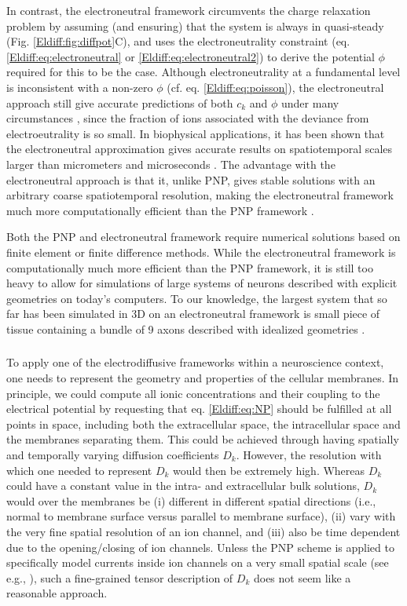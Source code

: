 In contrast, the electroneutral framework circumvents the charge relaxation problem by assuming (and ensuring) that the system is always in quasi-steady (Fig. \ref{Eldiff:fig:diffpot}C), and uses the electroneutrality constraint (eq. \ref{Eldiff:eq:electroneutral} or \ref{Eldiff:eq:electroneutral2}) to derive the potential $\phi$ required for this to be the case. 
Although electroneutrality at a fundamental level is inconsistent with a non-zero $\phi$ (cf. eq. \ref{Eldiff:eq:poisson}), the electroneutral approach still give accurate predictions of both $c_k$ and $\phi$ under many circumstances \citep{Feldberg2000}, since the fraction of ions associated with the deviance from electroeutrality is so small. In biophysical applications, it has been shown that the electroneutral approximation gives accurate results on spatiotemporal scales larger than micrometers and microseconds \citep{Grodzinsky2011, Pods2017, Solbra2018}. The advantage with the electroneutral approach is that it, unlike PNP, gives stable solutions with an arbitrary coarse spatiotemporal resolution, making the electroneutral framework much more computationally efficient than the PNP framework . 

Both the PNP and electroneutral framework require numerical solutions based on finite element or finite difference methods. While the electroneutral framework is computationally much more efficient than the PNP framework, it is still too heavy to allow for simulations of large systems of neurons described with explicit geometries on today's computers. To our knowledge, the largest system that so far has been simulated in 3D on an electroneutral framework is small piece of tissue containing a bundle of 9 axons described with idealized geometries \citep{ellingsrud2020}.


\subsubsection{}
\label{sec:Eldiff:BCs}
To apply one of the electrodiffusive frameworks within a neuroscience context, one needs to represent the geometry and properties of the cellular membranes. In principle, we could compute all ionic concentrations and their coupling to the electrical potential by requesting that eq. \ref{Eldiff:eq:NP} should be fulfilled at all points in space, including both the extracellular space, the intracellular space and the membranes separating them. This could be achieved through having spatially and temporally varying diffusion coefficients $D_k$. However, the resolution with which one needed to represent $D_k$ would then be extremely high. Whereas $D_k$ could have a constant value in the intra- and extracellular bulk solutions, $D_k$ would over the membranes be (i) different in different spatial directions (i.e., normal to membrane surface versus parallel to membrane surface), (ii) vary with the very fine spatial resolution of an ion channel, and (iii) also be time dependent due to the opening/closing of ion channels. Unless the PNP scheme is applied to specifically model currents inside ion channels on a very small spatial scale (see e.g., \citep{Gardner2011, Zheng2011}), such a fine-grained tensor description of $D_k$ does not seem like a reasonable approach. 

